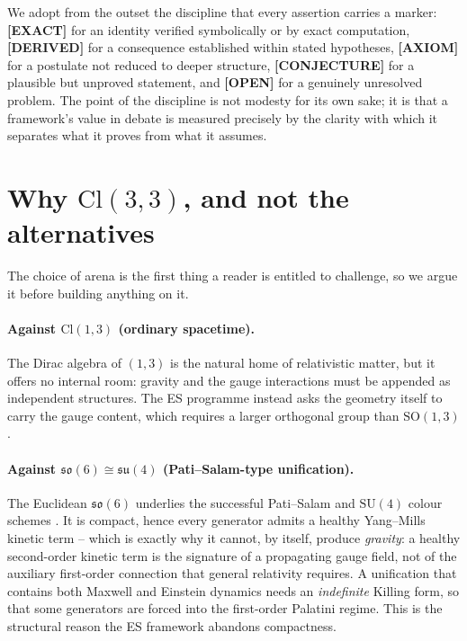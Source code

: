 \documentclass[11pt,oneside]{book}
\newcommand{\Cl}{\mathrm{Cl}}                     %
\newcommand{\su}{\mathfrak{su}}
\newcommand{\so}{\mathfrak{so}}
\newcommand{\status}[1]{{\sffamily\bfseries\color{statuscol}[#1]}}
\theoremstyle{plain}
\theoremstyle{definition}
\theoremstyle{remark}
\begin{document}
We adopt from the outset the discipline that every assertion carries a marker:
\status{EXACT} for an identity verified symbolically or by exact computation,
\status{DERIVED} for a consequence established within stated hypotheses,
\status{AXIOM} for a postulate not reduced to deeper structure,
\status{CONJECTURE} for a plausible but unproved statement, and \status{OPEN} for
a genuinely unresolved problem. The point of the discipline is not modesty for its
own sake; it is that a framework's value in debate is measured precisely by the
clarity with which it separates what it proves from what it assumes.

\section{Why $\Cl(3,3)$, and not the alternatives}
\label{sec:why}

The choice of arena is the first thing a reader is entitled to challenge, so we
argue it before building anything on it.

\paragraph{Against $\Cl(1,3)$ (ordinary spacetime).} The Dirac algebra of
$(1,3)$ is the natural home of relativistic matter, but it offers no internal
room: gravity and the gauge interactions must be appended as independent
structures. The ES programme instead asks the geometry itself to carry the gauge
content, which requires a larger orthogonal group than $\mathrm{SO}(1,3)$.

\paragraph{Against $\so(6)\cong\su(4)$ (Pati--Salam-type unification).} The
Euclidean $\so(6)$ underlies the successful Pati--Salam and $\mathrm{SU}(4)$ colour
schemes \cite{PatiSalam1974}. It is compact, hence every generator admits a
healthy Yang--Mills kinetic term -- which is exactly why it cannot, by itself,
produce \emph{gravity}: a healthy second-order kinetic term is the signature of a
propagating gauge field, not of the auxiliary first-order connection that
general relativity requires. A unification that contains both Maxwell and Einstein
dynamics needs an \emph{indefinite} Killing form, so that some generators are
forced into the first-order Palatini regime. This is the structural reason the ES
framework abandons compactness.
\end{document}
